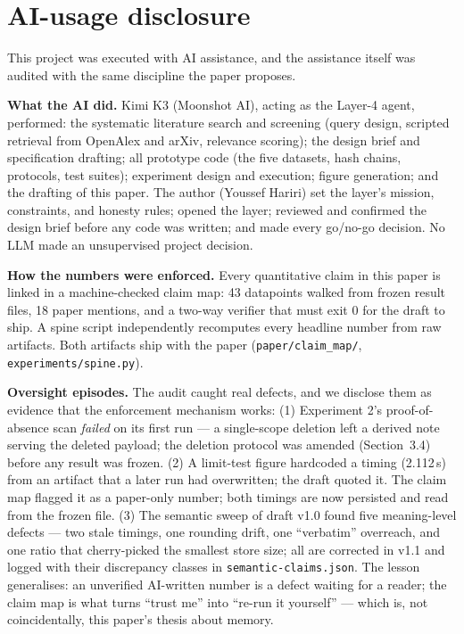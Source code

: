 \documentclass[11pt]{article}
\begin{document}
\section*{AI-usage disclosure}
This project was executed with AI assistance, and the assistance itself was audited with the same discipline the paper proposes.

\textbf{What the AI did.} Kimi K3 (Moonshot AI), acting as the Layer-4 agent, performed: the systematic literature search and screening (query design, scripted retrieval from OpenAlex and arXiv, relevance scoring); the design brief and specification drafting; all prototype code (the five datasets, hash chains, protocols, test suites); experiment design and execution; figure generation; and the drafting of this paper. The author (Youssef Hariri) set the layer's mission, constraints, and honesty rules; opened the layer; reviewed and confirmed the design brief before any code was written; and made every go/no-go decision. No LLM made an unsupervised project decision.

\textbf{How the numbers were enforced.} Every quantitative claim in this paper is linked in a machine-checked claim map: 43 datapoints walked from frozen result files, 18 paper mentions, and a two-way verifier that must exit 0 for the draft to ship. A spine script independently recomputes every headline number from raw artifacts. Both artifacts ship with the paper (\texttt{paper/claim\_map/}, \texttt{experiments/spine.py}).

\textbf{Oversight episodes.} The audit caught real defects, and we disclose them as evidence that the enforcement mechanism works: (1) Experiment 2's proof-of-absence scan \emph{failed} on its first run --- a single-scope deletion left a derived note serving the deleted payload; the deletion protocol was amended (Section~3.4) before any result was frozen. (2) A limit-test figure hardcoded a timing (2.112\,s) from an artifact that a later run had overwritten; the draft quoted it. The claim map flagged it as a paper-only number; both timings are now persisted and read from the frozen file. (3) The semantic sweep of draft v1.0 found five meaning-level defects --- two stale timings, one rounding drift, one ``verbatim'' overreach, and one ratio that cherry-picked the smallest store size; all are corrected in v1.1 and logged with their discrepancy classes in \texttt{semantic-claims.json}. The lesson generalises: an unverified AI-written number is a defect waiting for a reader; the claim map is what turns ``trust me'' into ``re-run it yourself'' --- which is, not coincidentally, this paper's thesis about memory.
\end{document}

